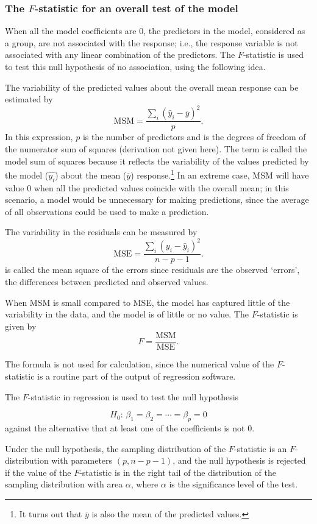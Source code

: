 \subsubsection{The $F$-statistic for an overall test of the model}

When all the model coefficients are 0, the predictors in the model, considered as a group, are not associated with the response; i.e., the response variable is not associated with any linear combination of the predictors. The $F$-statistic is used to test this null hypothesis of no association, using the following idea.  

The variability of the predicted values about the overall mean response can be estimated by
\[
   \text{MSM} =  \frac{\sum_i(\hat{y}_i - \overline{y})^2}{p}.
\]
In this expression, $p$ is the number of predictors and is the degrees of freedom of the numerator sum of squares (derivation not given here).  The term  is called the model sum of squares because it reflects the variability of the values predicted by the model ($\hat{y_i}$) about the mean ($\overline{y}$) response.\footnote{It turns out that $\overline{y}$ is also the mean of the predicted values.} In an extreme case, MSM will have value 0 when all the predicted values coincide with the overall mean; in this scenario, a model would be unnecessary for making predictions, since the average of all observations could be used to make a prediction.

The variability in the residuals can be measured by 
\[
  \text{MSE} = \frac{\sum_i(y_i - \hat{y}_i)^2}{n - p - 1}.
\]
 is called the mean square of the errors since residuals are
the observed `errors', the differences between predicted and observed
values.

When MSM is small compared to MSE, the model has captured little of the variability in the data, and the model is of little or no value.  The $F$-statistic is given by
\[
  F = \frac{\text{MSM}}{\text{MSE}}.
\]

The formula is not used for calculation, since the numerical value of the $F$-statistic is a routine part of the output of regression software.

\begin{termBox}{
The $F$-statistic in regression is used to test the null hypothesis 

\[
  H_0:\, \beta_1 = \beta_2 = \cdots = \beta_p = 0
\]
against the alternative that at least one of the coefficients is not 0.

Under the null hypothesis, the sampling distribution of the $F$-statistic is an $F$-distribution with parameters $(p, n - p - 1)$, and the null hypothesis is rejected if the value of the $F$-statistic is in the right tail of the distribution of the sampling distribution with area $\alpha$, where $\alpha$ is the significance level of the test.}
\end{termBox}

